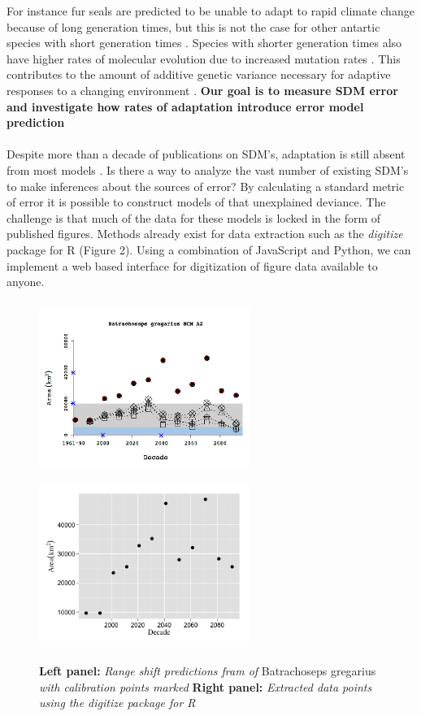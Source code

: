 \documentclass[pdftex,11pt,a4paper]{article}\usepackage{graphicx, color}
\begin{document}
For instance fur seals are predicted to be unable to adapt to rapid climate change because of long generation times, but this is not the case for other antartic species with short generation times \citep{Forcada2008}. Species with shorter generation times also have higher rates of molecular evolution due to increased mutation rates \citep{Thomas2010}.  This contributes to the amount of additive genetic variance necessary for adaptive responses to a changing environment \citep{Lande1996}.  \textbf{Our goal is to measure SDM error and investigate how rates of adaptation introduce error model prediction}\\
\\
Despite more than a decade of publications on SDM's, adaptation is still absent from most models \citep{Kearney2009}. Is there a way to analyze the vast number of existing SDM's to make inferences about the sources of error? By calculating a standard metric of error it is possible to construct models of that unexplained deviance.  The challenge is that much of the data for these models is locked in the form of published figures.  Methods already exist for data extraction such as the \textit{digitize} package \citep{Poisot2011} for R (Figure 2).  Using a combination of JavaScript and Python, we can implement a web based interface for digitization of figure data available to anyone.  

\begin{figure}[!h]
\centering
\includegraphics[height=2.2in,width=2.7in]{ExtractPlot.png}
\includegraphics[height=2.2in,width=2.7in]{exportdat.png}
\caption{\textbf{Left panel: }\textit{Range shift predictions fram \citet{Early2011} of} Batrachoseps gregarius \textit{ with calibration points marked} \textbf{Right panel: } \textit{Extracted data points using the digitize package for R \citep{Poisot2011}}}

\end{figure}
 
\end{document}
